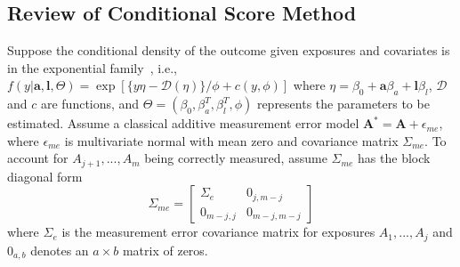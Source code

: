 \documentclass[useAMS,usenatbib,referee]{biom}
\begin{document}
\subsection{Review of Conditional Score Method}

Suppose the conditional density of the outcome given exposures and covariates is in the exponential family~\citep{mccullagh1989}, i.e., $f(y | \bm{a}, \bm{l}, \Theta) = \exp [ \{y\eta - \mathcal{D}(\eta)\}/ \phi + c(y, \phi) ]$ where $\eta = \beta_{0} + \bm{a}\beta_{a} + \bm{l}\beta_{l}$, $\mathcal{D}$ and $c$ are functions, and $\Theta = (\beta_{0}, \beta^{T}_{a}, \beta^{T}_{l}, \phi)$ represents the parameters to be estimated. Assume a classical additive measurement error model $\bm{A}^{*} = \bm{A} + \epsilon_{me}$, where $\epsilon_{me}$ is multivariate normal with mean zero and covariance matrix $\Sigma_{me}$. To account for $A_{j+1}, ...,  A_{m}$ being correctly measured, assume $\Sigma_{me}$ has the block diagonal form
\begin{equation*}
    \Sigma_{me} =
    \begin{bmatrix}
    \Sigma_{e} & 0_{j,m-j} \\
    0_{m-j,j} & 0_{m-j,m-j}
    \end{bmatrix}
\end{equation*}
where $\Sigma_{e}$ is the measurement error covariance matrix for exposures $A_{1},...,A_{j}$ and $0_{a,b}$ denotes an $a \times b$ matrix of zeros.
\end{document}
